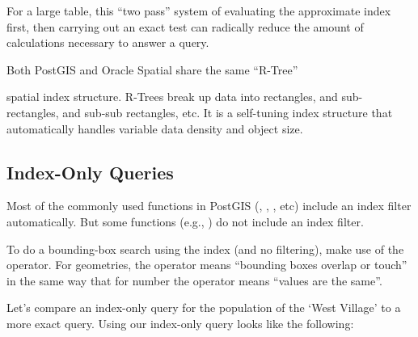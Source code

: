 \documentclass[a4paper,11pt,english]{sphinxmanual}
\begin{document}
For a large table, this “two pass” system of evaluating the approximate index first, then carrying out an exact test can radically reduce the amount of calculations necessary to answer a query.

Both PostGIS and Oracle Spatial share the same “R-Tree” %
\begin{footnote}[2]\sphinxAtStartFootnote
{}
%
\end{footnote} spatial index structure. R-Trees break up data into rectangles, and sub-rectangles, and sub-sub rectangles, etc.  It is a self-tuning index structure that automatically handles variable data density and object size.

\noindent{}


\subsection{Index-Only Queries}
\label{\detokenize{basic:index-only-queries}}
Most of the commonly used functions in PostGIS (, , , etc) include an index filter automatically. But some functions (e.g., ) do not include an index filter.

To do a bounding-box search using the index (and no filtering), make use of the \sphinxstyleliteralstrong{\sphinxupquote{\&\&}} operator. For geometries, the \sphinxstyleliteralstrong{\sphinxupquote{\&\&}} operator means “bounding boxes overlap or touch” in the same way that for number the \sphinxstyleliteralstrong{\sphinxupquote{=}} operator means “values are the same”.

Let’s compare an index-only query for the population of the ‘West Village’ to a more exact query. Using \sphinxstyleliteralstrong{\sphinxupquote{\&\&}} our index-only query looks like the following:

\begin{sphinxVerbatim}[commandchars=\\\{\}]
 
  
  
   
   
\end{sphinxVerbatim}
\end{document}
